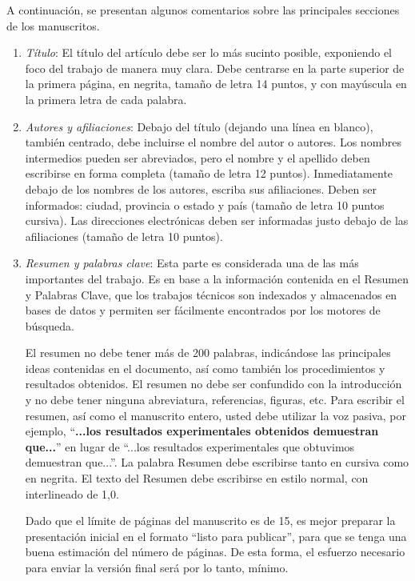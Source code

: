 \documentclass[a4paper, 12pt]{article}
\begin{document}
A continuación, se presentan algunos comentarios sobre las principales secciones de los manuscritos. 
\begin{enumerate}[label=\arabic*)]
    \item \textit{Título}: El título del artículo debe ser lo más sucinto posible, exponiendo el foco del trabajo de manera muy clara. Debe centrarse en la parte superior de la primera página, en negrita, tamaño de letra 14 puntos, y con mayúscula en la primera letra de cada palabra.
    
    \item \textit{Autores y afiliaciones}: Debajo del título (dejando una línea en blanco), también centrado, debe incluirse el nombre del autor o autores. Los nombres intermedios pueden ser abreviados, pero el nombre y el apellido deben escribirse en forma completa (tamaño de letra 12 puntos). Inmediatamente debajo de los nombres de los autores, escriba sus afiliaciones. Deben ser informados: ciudad, provincia o estado y país (tamaño de letra 10 puntos cursiva). Las direcciones electrónicas deben ser informadas justo debajo de las afiliaciones (tamaño de letra 10 puntos).
    \item \textit{Resumen y palabras clave}: Esta parte es considerada una de las más importantes del trabajo. Es en base a la información contenida en el Resumen y Palabras Clave, que los trabajos técnicos son indexados y almacenados en bases de datos y permiten ser fácilmente encontrados por los motores de búsqueda.
    
    El resumen no debe tener más de 200 palabras, indicándose las principales ideas contenidas en el documento, así como también los procedimientos y resultados obtenidos. El resumen no debe ser confundido con la introducción y no debe tener ninguna abreviatura, referencias, figuras, etc. Para escribir el resumen, así como el manuscrito entero, usted debe utilizar la voz pasiva, por ejemplo, “\textbf{...los resultados experimentales obtenidos demuestran que...}” en lugar de “...los resultados experimentales que obtuvimos demuestran que...”. La palabra Resumen debe escribirse tanto en cursiva como en negrita. El texto del Resumen debe escribirse en estilo normal, con interlineado de 1,0.

 
    Dado que el límite de páginas del manuscrito es de 15, es mejor preparar la presentación inicial en el formato “listo para publicar”, para que se tenga una buena estimación del número de páginas. De esta forma, el esfuerzo necesario para enviar la versión final será por lo tanto, mínimo.


\end{enumerate}
\end{document}
